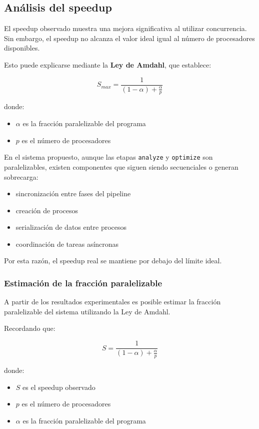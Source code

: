 \documentclass[12pt]{article}
\begin{document}
\subsection{Análisis del speedup}

El speedup observado muestra una mejora significativa al utilizar
concurrencia. Sin embargo, el speedup no alcanza el valor ideal
igual al número de procesadores disponibles.

Esto puede explicarse mediante la \textbf{Ley de Amdahl}, que establece:

\[
S_{max} = \frac{1}{(1-\alpha) + \frac{\alpha}{p}}
\]

donde:

\begin{itemize}
\item \(\alpha\) es la fracción paralelizable del programa
\item \(p\) es el número de procesadores
\end{itemize}

En el sistema propuesto, aunque las etapas \texttt{analyze} y
\texttt{optimize} son paralelizables, existen componentes que siguen
siendo secuenciales o generan sobrecarga:

\begin{itemize}
\item sincronización entre fases del pipeline
\item creación de procesos
\item serialización de datos entre procesos
\item coordinación de tareas asíncronas
\end{itemize}

Por esta razón, el speedup real se mantiene por debajo del límite ideal.

\subsubsection{Estimación de la fracción paralelizable}

A partir de los resultados experimentales es posible estimar la fracción
paralelizable del sistema utilizando la Ley de Amdahl.

Recordando que:

\[
S = \frac{1}{(1-\alpha) + \frac{\alpha}{p}}
\]

donde:

\begin{itemize}
\item \(S\) es el speedup observado
\item \(p\) es el número de procesadores
\item \(\alpha\) es la fracción paralelizable del programa
\end{itemize}
\end{document}
